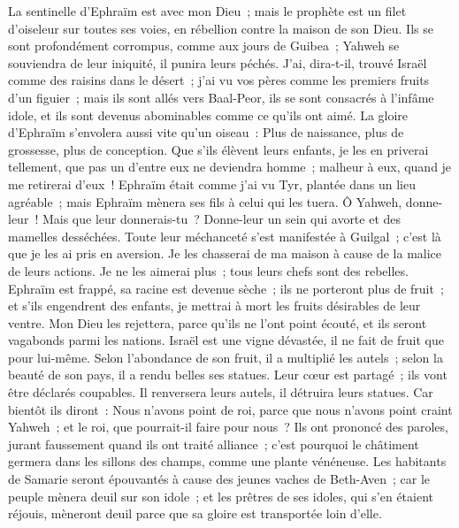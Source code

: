 \begin{multicols}{2}
La sentinelle d'Ephraïm est avec mon Dieu~; mais le prophète est un filet d'oiseleur sur toutes ses voies, en rébellion contre la maison de son Dieu.
Ils se sont profondément corrompus, comme aux jours de Guibea~; Yahweh se souviendra de leur iniquité, il punira leurs péchés.
J'ai, dira-t-il, trouvé Israël comme des raisins dans le désert~; j'ai vu vos pères comme les premiers fruits d'un figuier~; mais ils sont allés vers Baal-Peor, ils se sont consacrés à l'infâme idole, et ils sont devenus abominables comme ce qu'ils ont aimé.
La gloire d'Ephraïm s'envolera aussi vite qu'un oiseau~: Plus de naissance, plus de grossesse, plus de conception.
Que s'ils élèvent leurs enfants, je les en priverai tellement, que pas un d'entre eux ne deviendra homme~; malheur à eux, quand je me retirerai d'eux~!
Ephraïm était comme j'ai vu Tyr, plantée dans un lieu agréable~; mais Ephraïm mènera ses fils à celui qui les tuera.
Ô Yahweh, donne-leur~! Mais que leur donnerais-tu~? Donne-leur un sein qui avorte et des mamelles desséchées.
Toute leur méchanceté s'est manifestée à Guilgal~; c'est là que je les ai pris en aversion. Je les chasserai de ma maison à cause de la malice de leurs actions. Je ne les aimerai plus~; tous leurs chefs sont des rebelles.
Ephraïm est frappé, sa racine est devenue sèche~; ils ne porteront plus de fruit~; et s'ils engendrent des enfants, je mettrai à mort les fruits désirables de leur ventre.
Mon Dieu les rejettera, parce qu'ils ne l'ont point écouté, et ils seront vagabonds parmi les nations.
\VerseOne{}Israël est une vigne dévastée, il ne fait de fruit que pour lui-même. Selon l'abondance de son fruit, il a multiplié les autels~; selon la beauté de son pays, il a rendu belles ses statues.
Leur cœur est partagé~; ils vont être déclarés coupables. Il renversera leurs autels, il détruira leurs statues.
Car bientôt ils diront~: Nous n'avons point de roi, parce que nous n'avons point craint Yahweh~; et le roi, que pourrait-il faire pour nous~?
Ils ont prononcé des paroles, jurant faussement quand ils ont traité alliance~; c'est pourquoi le châtiment germera dans les sillons des champs, comme une plante vénéneuse.
Les habitants de Samarie seront épouvantés à cause des jeunes vaches de Beth-Aven~; car le peuple mènera deuil sur son idole~; et les prêtres de ses idoles, qui s'en étaient réjouis, mèneront deuil parce que sa gloire est transportée loin d'elle.

\end{multicols}
